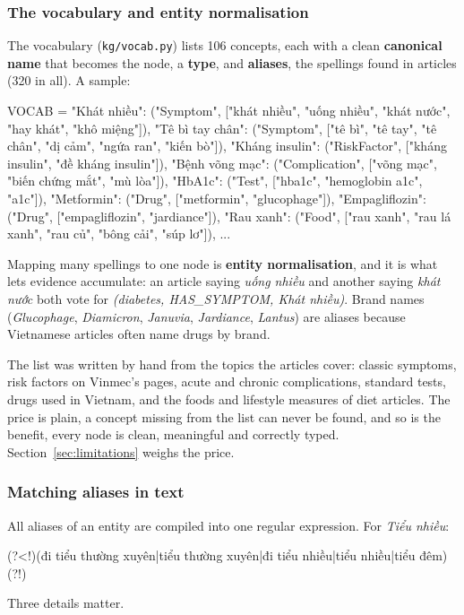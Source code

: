 \documentclass[11pt, a4paper]{article}
\newcommand{\code}[1]{\texttt{#1}}
\begin{document}
\subsubsection{The vocabulary and entity normalisation}

The vocabulary (\code{kg/vocab.py}) lists 106 concepts, each with a clean \textbf{canonical name} that becomes the node, a \textbf{type}, and \textbf{aliases}, the spellings found in articles (320 in all). A sample:

\begin{codeblock}
VOCAB = {
    "Khát nhiều":    ("Symptom", ["khát nhiều", "uống nhiều", "khát nước", "hay khát", "khô miệng"]),
    "Tê bì tay chân": ("Symptom", ["tê bì", "tê tay", "tê chân", "dị cảm", "ngứa ran", "kiến bò"]),
    "Kháng insulin": ("RiskFactor", ["kháng insulin", "đề kháng insulin"]),
    "Bệnh võng mạc": ("Complication", ["võng mạc", "biến chứng mắt", "mù lòa"]),
    "HbA1c":         ("Test", ["hba1c", "hemoglobin a1c", "a1c"]),
    "Metformin":     ("Drug", ["metformin", "glucophage"]),
    "Empagliflozin": ("Drug", ["empagliflozin", "jardiance"]),
    "Rau xanh":      ("Food", ["rau xanh", "rau lá xanh", "rau củ", "bông cải", "súp lơ"]),
    ...
}
\end{codeblock}

Mapping many spellings to one node is \textbf{entity normalisation}, and it is what lets evidence accumulate: an article saying \emph{uống nhiều} and another saying \emph{khát nước} both vote for \emph{(diabetes, HAS\_SYMPTOM, Khát nhiều)}. Brand names (\emph{Glucophage}, \emph{Diamicron}, \emph{Januvia}, \emph{Jardiance}, \emph{Lantus}) are aliases because Vietnamese articles often name drugs by brand.

The list was written by hand from the topics the articles cover: classic symptoms, risk factors on Vinmec's pages, acute and chronic complications, standard tests, drugs used in Vietnam, and the foods and lifestyle measures of diet articles. The price is plain, a concept missing from the list can never be found, and so is the benefit, every node is clean, meaningful and correctly typed. Section~\ref{sec:limitations} weighs the price.

\subsubsection{Matching aliases in text}

All aliases of an entity are compiled into one regular expression. For \emph{Tiểu nhiều}:
\begin{codeblock}
(?<!\w)(đi tiểu thường xuyên|tiểu thường xuyên|đi tiểu nhiều|tiểu nhiều|tiểu đêm)(?!\w)
\end{codeblock}
Three details matter.
\end{document}
